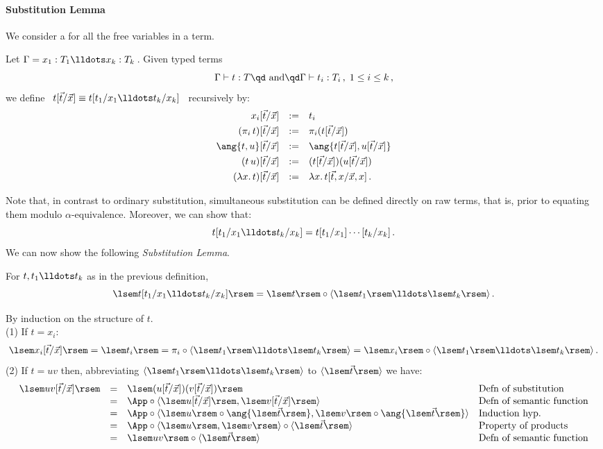 \documentclass[12pt]{article}
\begin{document}
\paragraph{Substitution Lemma} We consider a  for all the free variables in a term.
\begin{mydefinition}
Let $\Gamma=x_{1}:T_{1}\lldots x_{k}:T_{k}$\,. Given typed terms
\[ \Gamma \vdash t : T  \text{\qd and\qd} \Gamma \vdash t_{i} : T_{i}\,,\; 1 \leq i \leq k\,,\]
we define \ $t[\vec{t}/\vec{x}] \equiv t[t_{1}/x_{1}\lldots t_{k}/x_{k}]$ \ recursively by:
\[\begin{array}{rcl}
x_{i}[\vec{t}/\vec{x}]  & := & t_{i}\\[1.1mm]
(\pi_i\,t)[\vec{t}/\vec{x}] & := & \pi_i(t[\vec{t}/\vec{x}]) \\[1.1mm]
\ang{t,u}[\vec{t}/\vec{x}] & := & \ang{t[\vec{t}/\vec{x}],u[\vec{t}/\vec{x}]} \\[1.1mm]
(t\,u)[\vec{t}/\vec{x}]  & := & (t[\vec{t}/\vec{x}])(u[\vec{t}/\vec{x}]) \\[1.1mm]
(\lambda x.\,t)[\vec{t}/\vec{x}]  & := & \lambda x.\, t[\vec{t},x/\vec{x},x]\,.
\end{array}\]\deq[-1]
\end{mydefinition}
%
Note that, in contrast to ordinary substitution, simultaneous substitution can be defined directly on raw terms, that is, prior to equating them
modulo $\alpha\text{-equivalence}$. Moreover, we can show that:
\[ t[t_{1}/x_{1}\lldots t_{k}/x_{k}] = t[t_{1}/x_{1}]\cdots[t_{k}/x_{k}]\,. \]
%
We can now show the following \emph{Substitution Lemma}.
%
\begin{myproposition} For $t,t_1\lldots t_k$ as in the previous definition,
\[ \lsem t[t_{1}/x_{1}\lldots t_{k}/x_{k}] \rsem = \lsem t \rsem \circ \langle \lsem t_{1} \rsem \lldots \lsem t_{k} \rsem \rangle\,. \]
\end{myproposition}
\proof By induction on the structure of $t$.
\\
(1) If $t = x_{i}$:
\[ \lsem x_{i}[\vec{t}/\vec{x}]  \rsem = \lsem t_{i} \rsem = \pi_{i} \circ  \langle \lsem t_{1} \rsem \lldots \lsem t_{k}
\rsem \rangle = \lsem x_{i} \rsem \circ  \langle \lsem t_{1} \rsem \lldots \lsem t_{k} \rsem \rangle\,. \]
%
(2) If $t = uv$ then, abbreviating $\langle \lsem t_{1} \rsem \lldots \lsem t_{k} \rsem \rangle$ to $\langle \lsem \vec{t} \rsem \rangle$ we have:
\[ \begin{array}{rcl@{\quad}l}
\lsem uv[\vec{t}/\vec{x}] \rsem & = & \lsem  (u[\vec{t}/\vec{x}])(v[\vec{t}/\vec{x}])\rsem & \text{Defn of substitution} \\
& = & \App \circ \langle \lsem u[\vec{t}/\vec{x}] \rsem, \lsem v[\vec{t}/\vec{x}] \rsem \rangle & \text{Defn of semantic function} \\
& = &  \App \circ \langle \lsem u \rsem\circ\ang{\lsem\vec{t}\rsem}, \lsem v \rsem\circ\ang{\lsem\vec{t}\rsem}\rangle & \text{Induction hyp.} \\
& = &  \App \circ \langle \lsem u \rsem  , \lsem v \rsem \rangle \circ \langle \lsem \vec{t} \rsem \rangle & \text{Property of products} \\
& = & \lsem uv \rsem  \circ \langle \lsem \vec{t} \rsem \rangle & \text{Defn of semantic function}
\end{array}\]
\end{document}
